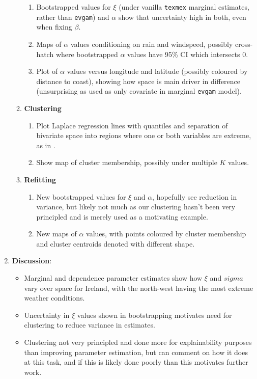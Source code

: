 \documentclass{article}
\numberwithin{equation}{section}
\begin{document}
\begin{enumerate}
\begin{enumerate}
\begin{enumerate}
          \item Bootstrapped values for $\xi$ (under vanilla \texttt{texmex} marginal estimates, rather than \texttt{evgam}) and $\alpha$ show that uncertainty high in both, even when fixing $\beta$. 
          \item Maps of $\alpha$ values conditioning on rain and windspeed, possibly cross-hatch where bootstrapped $\alpha$ values have 95\% CI which intersects 0. 
          \item Plot of $\alpha$ values versus longitude and latitude (possibly coloured by distance to coast), showing how space is main driver in difference (unsurprising as used as only covariate in marginal \texttt{evgam} model). 
        \end{enumerate}
      \item \textbf{Clustering}
        \begin{enumerate}
          \item Plot Laplace regression lines with quantiles and separation of bivariate space into regions where one or both variables are extreme, as in \cite{Vignotto2021}. 
          \item Show map of cluster membership, possibly under multiple $K$ values. 
        \end{enumerate} 
      \item \textbf{Refitting}
        \begin{enumerate}
          \item New bootstrapped values for $\xi$ and $\alpha$, hopefully see reduction in variance, but likely not much as our clustering hasn't been very principled and is merely used as a motivating example. 
          \item New maps of $\alpha$ values, with points coloured by cluster membership and cluster centroids denoted with different shape. 
        \end{enumerate}
    \end{enumerate}
  \item \textbf{Discussion}:
    \begin{itemize}
      \item Marginal and dependence parameter estimates show how $\xi$ and $sigma$ vary over space for Ireland, with the north-west having the most extreme weather conditions. 
      \item Uncertainty in $\xi$ values shown in bootstrapping motivates need for clustering to reduce variance in estimates.
      \item Clustering not very principled and done more for explainability purposes than improving parameter estimation, but can comment on how it does at this task, and if this is likely done poorly than this motivates further work. 
    \end{itemize}
\end{enumerate}
\end{document}
